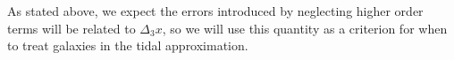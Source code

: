 As stated above, we expect the errors introduced by neglecting higher order terms will be related to $\Delta_3 x$, so we will use this quantity as a criterion for when to treat galaxies in the tidal approximation.